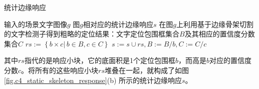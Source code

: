         \begin{algorithm} \renewcommand{\algorithmicrequire}{\textbf{输入:}}	\renewcommand{\algorithmicensure}{\textbf{输出:}}
    	\caption{统计边缘响应}
    	\label{alg:c4_static_skeleton_response}
    	\begin{algorithmic}[1]
    		\REQUIRE 输入的场景文字图像$g$
    		\ENSURE 图$g$相对应的统计边缘响应$s$
            \STATE 在图$g$上利用基于边缘骨架切割的文字检测子得到粗略的定位结果：文字定位包围框集合$B$及其相应的置信度分数集合$C$
    		\REPEAT
            \STATE $rs:=\left\{ b \times c  |\,b \in B, c \in C\right\}$
            \STATE $s:=s\cup rs,B:=B / b,C:=C / c$
    	\end{algorithmic}
        \end{algorithm}

        其中$rs$指代的是响应小块，它的底面积是1个定位包围框$b$，而高是$b$对应的置信度分数$c$。将所有的这些响应小块$rs$堆叠在一起，就构成了如图\ref{fig.c4_static_skeleton_response}(b) 所示的统计边缘响应$s$。

